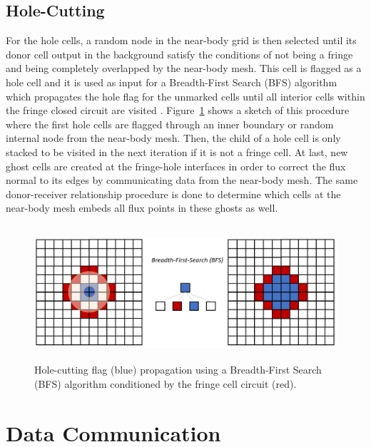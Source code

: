\subsection{Hole-Cutting}
For the hole cells, a random node in the near-body grid is then selected until its donor cell output in the background satisfy the conditions of not being a fringe and being completely overlapped by the near-body mesh. This cell is flagged as a hole cell and it is used as input for a Breadth-First Search (BFS) algorithm which propagates the hole flag for the unmarked cells until all interior cells within the fringe closed circuit are visited \cite{CormenBook2009}. Figure\ \ref{fig:hole_cutting_bfs} shows a sketch of this procedure where the first hole cells are flagged through an inner boundary or random internal node from the near-body mesh. Then, the child of a hole cell is only stacked to be visited in the next iteration if it is not a fringe cell. At last, new ghost cells are created at the fringe-hole interfaces in order to correct the flux normal to its edges by communicating data from the near-body mesh. The same donor-receiver relationship procedure is done to determine which cells at the near-body mesh embeds all flux points in these ghosts as well.
% 
\begin{figure}[H]
	\centering
	\includegraphics[height=5.0cm]{figs/overset/hole_cutting_bfs.png}
    \caption{Hole-cutting flag (blue) propagation using a Breadth-First Search (BFS) algorithm conditioned by the fringe cell circuit (red).}
    \label{fig:hole_cutting_bfs}
\end{figure}

\section{Data Communication}

